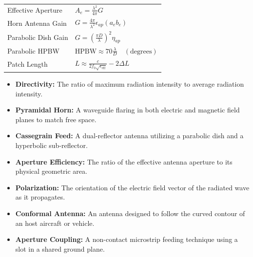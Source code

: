 \documentclass[12pt,a4paper]{article}
\renewcommand{\arraystretch}{1.45}
\begin{document}
\begin{tcolorbox}[formulabox, title={\textbf{Key Formulas at a Glance}}]
\renewcommand{\arraystretch}{1.3}
\begin{tabularx}{\linewidth}{B{4.5cm} X}Effective Aperture      & $A_e = \frac{\lambda^2}{4\pi} G$ \\[4pt]
Horn Antenna Gain       & $G = \frac{4\pi}{\lambda^2} \epsilon_{ap} (a_e b_e)$ \\[4pt]
Parabolic Dish Gain     & $G = \left(\frac{\pi D}{\lambda}\right)^{\!2} \eta_{ap}$ \\[4pt]
Parabolic HPBW          & $\text{HPBW} \approx 70 \frac{\lambda}{D} \quad (\text{degrees})$ \\[4pt]
Patch Length            & $L \approx \frac{c}{2 f_0 \sqrt{\epsilon_{\text{eff}}}} - 2\Delta L$
\end{tabularx}
\end{tcolorbox}

\begin{tcolorbox}[defbox, title={\textbf{One-Line Definitions}}]
\begin{itemize}[leftmargin=*, itemsep=2.5pt, topsep=0pt]
  \item \textbf{Directivity:} The ratio of maximum radiation intensity to average radiation intensity.
  \item \textbf{Pyramidal Horn:} A waveguide flaring in both electric and magnetic field planes to match free space.
  \item \textbf{Cassegrain Feed:} A dual-reflector antenna utilizing a parabolic dish and a hyperbolic sub-reflector.
  \item \textbf{Aperture Efficiency:} The ratio of the effective antenna aperture to its physical geometric area.
  \item \textbf{Polarization:} The orientation of the electric field vector of the radiated wave as it propagates.
  \item \textbf{Conformal Antenna:} An antenna designed to follow the curved contour of an host aircraft or vehicle.
  \item \textbf{Aperture Coupling:} A non-contact microstrip feeding technique using a slot in a shared ground plane.
\end{itemize}
\end{tcolorbox}
\end{document}
